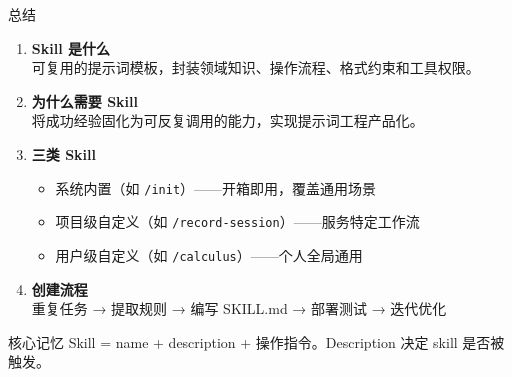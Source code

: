 \documentclass[aspectratio=169]{ctexbeamer}
\begin{document}
\begin{frame}{总结}
\large

\begin{enumerate}
  \setlength\itemsep{6pt}
  \item \textbf{Skill 是什么}\\
  可复用的提示词模板，封装领域知识、操作流程、格式约束和工具权限。

  \item \textbf{为什么需要 Skill}\\
  将成功经验固化为可反复调用的能力，实现\alert{提示词工程产品化}。

  \item \textbf{三类 Skill}\\
  \begin{itemize}
    \item 系统内置（如 \texttt{/init}）——开箱即用，覆盖通用场景
    \item 项目级自定义（如 \texttt{/record-session}）——服务特定工作流
    \item 用户级自定义（如 \texttt{/calculus}）——个人全局通用
  \end{itemize}

  \item \textbf{创建流程}\\
  重复任务 → 提取规则 → 编写 SKILL.md → 部署测试 → 迭代优化
\end{enumerate}

\vspace{0.15cm}

\begin{block}{核心记忆}
  Skill = name + description + 操作指令。Description 决定 skill 是否被触发。
\end{block}
\end{frame}
\end{document}
